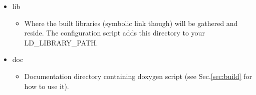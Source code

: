 \begin{itemize}
    \item {\ttfamily lib}
      \begin{itemize}
          \item Where the built libraries (symbolic link though) will be gathered and reside. The configuration script adds this directory to your {\ttfamily LD\_LIBRARY\_PATH}.
      \end{itemize}

    \item {\ttfamily doc}
      \begin{itemize}
          \item Documentation directory containing doxygen script (see Sec.\ref{sec:build} for how to use it).
      \end{itemize}

\end{itemize}
